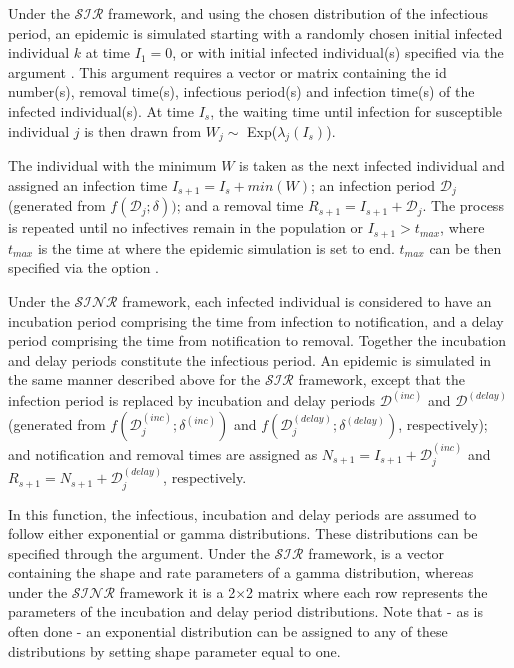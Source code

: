 \documentclass[nojss,shortnames]{jss}
\begin{document}
Under the $\mathcal{SIR}$ framework, and using the chosen distribution of the infectious period, an epidemic is simulated starting with a randomly chosen initial infected individual $k$ at time $I_{1} = 0$, or with initial infected individual(s) specified via the argument . This argument requires a vector or matrix containing the id number(s), removal time(s), infectious period(s) and infection time(s) of the infected individual(s). At time $I_{s}$, the waiting time until infection for susceptible individual $j$ is then drawn from $W_{j} \sim$ Exp($\lambda_{j}(I_{s})$).

The individual with the minimum $W$ is taken as the next infected individual and assigned an infection time $I_{s+1} = I_{s}+min(W)$; an infection period $\mathcal{D}_{j}$ (generated from $f(\mathcal{D}_{j};\delta))$; and a removal time $R_{s+1} = I_{s+1}+\mathcal{D}_{j}$. The process is repeated until no infectives remain in the population or $I_{s+1} > t_{max}$, where $t_{max}$ is the time at where the epidemic simulation is set to end. $t_{max}$ can be then specified via the option .

Under the $\mathcal{SINR}$ framework, each infected individual is considered to have an incubation period comprising the time from infection to notification, and a delay period comprising the time from notification to removal. Together the incubation and delay periods constitute the infectious period. An epidemic is simulated in the same manner described above for the $\mathcal{SIR}$ framework, except that the infection period is replaced by incubation and delay periods $\mathcal{D}^{(inc)}$ and $\mathcal{D}^{(delay)}$ (generated from $f(\mathcal{D}^{(inc)}_{j};\delta^{(inc)})$ and $f(\mathcal{D}^{(delay)}_{j};\delta^{(delay)})$, respectively); and notification and removal times are assigned as $N_{s+1} = I_{s+1}+\mathcal{D}^{(inc)}_{j}$ and $R_{s+1} = N_{s+1}+\mathcal{D}^{(delay)}_{j}$, respectively.

In this function, the infectious, incubation and delay periods are assumed to follow either exponential or gamma distributions. These distributions can be specified through the  argument. Under the $\mathcal{SIR}$ framework,  is a vector containing the shape and rate parameters of a gamma distribution, whereas under the $\mathcal{SINR}$ framework it is a 2$\times$2 matrix where each row represents the parameters of the incubation and delay period distributions. Note that - as is often done - an exponential distribution can be assigned to any of these distributions by setting shape parameter equal to one.
\end{document}
